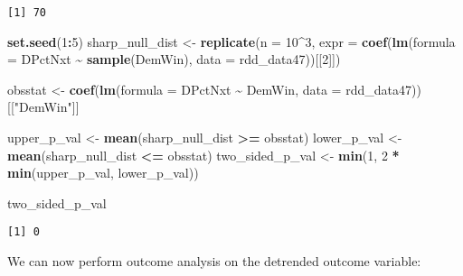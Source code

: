\documentclass[
  12pt,
  leqno]{article}
\newenvironment{Shaded}{\begin{snugshade}}{\end{snugshade}}
\newcommand{\AttributeTok}[1]{\textcolor[rgb]{0.13,0.29,0.53}{#1}}
\newcommand{\DecValTok}[1]{\textcolor[rgb]{0.00,0.00,0.81}{#1}}
\newcommand{\FunctionTok}[1]{\textcolor[rgb]{0.13,0.29,0.53}{\textbf{#1}}}
\newcommand{\NormalTok}[1]{#1}
\newcommand{\OtherTok}[1]{\textcolor[rgb]{0.56,0.35,0.01}{#1}}
\newcommand{\SpecialCharTok}[1]{\textcolor[rgb]{0.81,0.36,0.00}{\textbf{#1}}}
\newcommand{\StringTok}[1]{\textcolor[rgb]{0.31,0.60,0.02}{#1}}
\begin{document}
\begin{verbatim}
[1] 70
\end{verbatim}

\begin{Shaded}
\begin{Highlighting}[]
\FunctionTok{set.seed}\NormalTok{(}\DecValTok{1}\SpecialCharTok{:}\DecValTok{5}\NormalTok{)}
\NormalTok{sharp\_null\_dist }\OtherTok{\textless{}{-}} \FunctionTok{replicate}\NormalTok{(}\AttributeTok{n =} \DecValTok{10}\SpecialCharTok{\^{}}\DecValTok{3}\NormalTok{, }\AttributeTok{expr =} \FunctionTok{coef}\NormalTok{(}\FunctionTok{lm}\NormalTok{(}\AttributeTok{formula =}\NormalTok{ DPctNxt }\SpecialCharTok{\textasciitilde{}} \FunctionTok{sample}\NormalTok{(DemWin),}
    \AttributeTok{data =}\NormalTok{ rdd\_data47))[[}\DecValTok{2}\NormalTok{]])}

\NormalTok{obsstat }\OtherTok{\textless{}{-}} \FunctionTok{coef}\NormalTok{(}\FunctionTok{lm}\NormalTok{(}\AttributeTok{formula =}\NormalTok{ DPctNxt }\SpecialCharTok{\textasciitilde{}}\NormalTok{ DemWin, }\AttributeTok{data =}\NormalTok{ rdd\_data47))[[}\StringTok{"DemWin"}\NormalTok{]]}

\NormalTok{upper\_p\_val }\OtherTok{\textless{}{-}} \FunctionTok{mean}\NormalTok{(sharp\_null\_dist }\SpecialCharTok{\textgreater{}=}\NormalTok{ obsstat)}
\NormalTok{lower\_p\_val }\OtherTok{\textless{}{-}} \FunctionTok{mean}\NormalTok{(sharp\_null\_dist }\SpecialCharTok{\textless{}=}\NormalTok{ obsstat)}
\NormalTok{two\_sided\_p\_val }\OtherTok{\textless{}{-}} \FunctionTok{min}\NormalTok{(}\DecValTok{1}\NormalTok{, }\DecValTok{2} \SpecialCharTok{*} \FunctionTok{min}\NormalTok{(upper\_p\_val, lower\_p\_val))}

\NormalTok{two\_sided\_p\_val}
\end{Highlighting}
\end{Shaded}

\begin{verbatim}
[1] 0
\end{verbatim}

\begin{Shaded}
\end{Shaded}

\normalsize

We can now perform outcome analysis on the detrended outcome variable:
\end{document}
